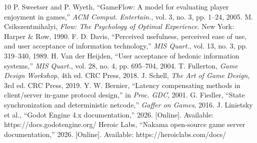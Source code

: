 \documentclass[conference]{IEEEtran}
\begin{document}
\begin{thebibliography}{10}
 P. Sweetser and P. Wyeth, ``GameFlow: A model for evaluating player enjoyment in games,'' \textit{ACM Comput. Entertain.}, vol. 3, no. 3, pp. 1--24, 2005.
 M. Csikszentmihalyi, \textit{Flow: The Psychology of Optimal Experience}. New York: Harper \& Row, 1990.
 F. D. Davis, ``Perceived usefulness, perceived ease of use, and user acceptance of information technology,'' \textit{MIS Quart.}, vol. 13, no. 3, pp. 319--340, 1989.
 H. Van der Heijden, ``User acceptance of hedonic information systems,'' \textit{MIS Quart.}, vol. 28, no. 4, pp. 695--704, 2004.
 T. Fullerton, \textit{Game Design Workshop}, 4th ed. CRC Press, 2018.
 J. Schell, \textit{The Art of Game Design}, 3rd ed. CRC Press, 2019.
 Y. W. Bernier, ``Latency compensating methods in client/server in-game protocol design,'' in \textit{Proc. GDC}, 2001.
 G. Fiedler, ``State synchronization and deterministic netcode,'' \textit{Gaffer on Games}, 2016.
 J. Linietsky et al., ``Godot Engine 4.x documentation,'' 2026. [Online]. Available: https://docs.godotengine.org/
 Heroic Labs, ``Nakama open-source game server documentation,'' 2026. [Online]. Available: https://heroiclabs.com/docs/
\end{thebibliography}
\end{document}
